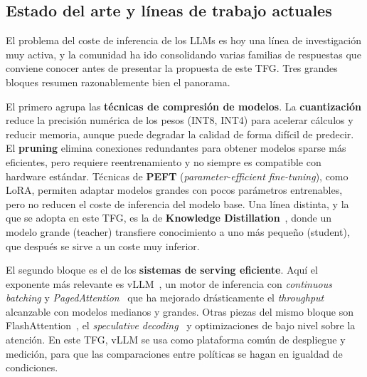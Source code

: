 \subsection{Estado del arte y líneas de trabajo actuales}

El problema del coste de inferencia de los LLMs es hoy una línea de investigación muy activa, y la comunidad ha ido consolidando varias familias de respuestas que conviene conocer antes de presentar la propuesta de este TFG. Tres grandes bloques resumen razonablemente bien el panorama.

El primero agrupa las \textbf{técnicas de compresión de modelos}. La \textbf{cuantización} reduce la precisión numérica de los pesos (INT8, INT4) para acelerar cálculos y reducir memoria, aunque puede degradar la calidad de forma difícil de predecir. El \textbf{pruning} elimina conexiones redundantes para obtener modelos sparse más eficientes, pero requiere reentrenamiento y no siempre es compatible con hardware estándar. Técnicas de \textbf{PEFT} (\textit{parameter-efficient fine-tuning}), como LoRA, permiten adaptar modelos grandes con pocos parámetros entrenables, pero no reducen el coste de inferencia del modelo base. Una línea distinta, y la que se adopta en este TFG, es la de \textbf{Knowledge Distillation}~\cite{hinton2015distilling}, donde un modelo grande (teacher) transfiere conocimiento a uno más pequeño (student), que después se sirve a un coste muy inferior.

El segundo bloque es el de los \textbf{sistemas de serving eficiente}. Aquí el exponente más relevante es vLLM~\cite{vllm-docs}, un motor de inferencia con \emph{continuous batching} y \emph{PagedAttention}~\cite{vllm2023} que ha mejorado drásticamente el \textit{throughput} alcanzable con modelos medianos y grandes. Otras piezas del mismo bloque son FlashAttention~\cite{dao2022flashattention}, el \textit{speculative decoding}~\cite{leviathan2023speculative} y optimizaciones de bajo nivel sobre la atención. En este TFG, vLLM se usa como plataforma común de despliegue y medición, para que las comparaciones entre políticas se hagan en igualdad de condiciones.

